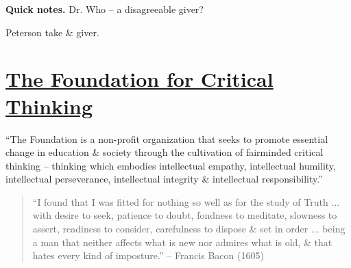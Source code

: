\documentclass[oneside]{book}
\numberwithin{equation}{section}
\begin{document}
\textbf{Quick notes.} Dr. Who -- a disagreeable giver?

Peterson take \& giver.


\chapter{\href{https://www.criticalthinking.org/}{The Foundation for Critical Thinking}}

``The Foundation is a non-profit organization that seeks to promote essential change in education \& society through the cultivation of fairminded critical thinking -- thinking which embodies intellectual empathy, intellectual humility, intellectual perseverance, intellectual integrity \& intellectual responsibility.''

\begin{quotation}
	``I found that I was fitted for nothing so well as for the study of Truth $\ldots$ with desire to seek, patience to doubt, fondness to meditate, slowness to assert, readiness to consider, carefulness to dispose \& set in order $\ldots$ being a man that neither affects what is new nor admires what is old, \& that hates every kind of imposture.'' -- Francis Bacon (1605)
\end{quotation}
\end{document}

